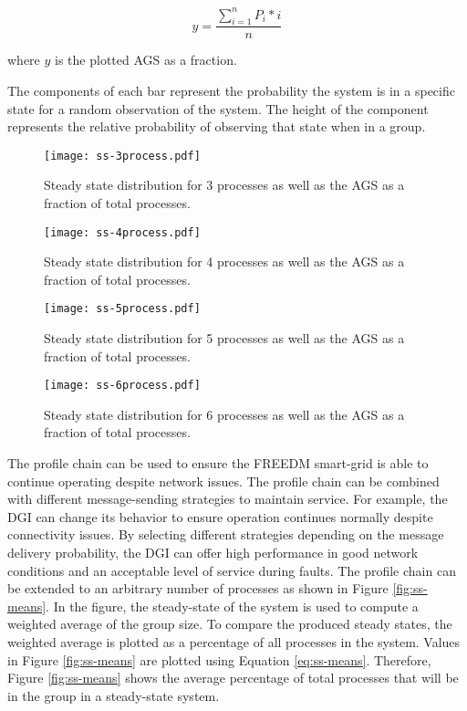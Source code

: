 \begin{equation} y = \frac{\sum_{i=1}^{n} P_{i}*i}{n} \label{eq:ss-means} \end{equation}

where $y$ is the plotted \ac{AGS} as a fraction.

The components of each bar represent the probability the system is in a specific state for a random observation of the system.
The height of the component represents the relative probability of observing that state when in a group.

\begin{figure}
    \centering
    \texttt{[image: ss-3process.pdf]}
    \caption{Steady state distribution for 3 processes as well as the \ac{AGS} as a fraction of total processes.}
    \label{fig:ss-3process}
\end{figure}

\begin{figure}
    \centering
    \texttt{[image: ss-4process.pdf]}
    \caption{Steady state distribution for 4 processes as well as the \ac{AGS} as a fraction of total processes.}
    \label{fig:ss-4process}
\end{figure}

\begin{figure}
    \centering
    \texttt{[image: ss-5process.pdf]}
    \caption{Steady state distribution for 5 processes as well as the \ac{AGS} as a fraction of total processes.}
    \label{fig:ss-5process}
\end{figure}

\begin{figure}
    \centering
    \texttt{[image: ss-6process.pdf]}
    \caption{Steady state distribution for 6 processes as well as the \ac{AGS} as a fraction of total processes.}
    \label{fig:ss-6process}
\end{figure}

The profile chain can be used to ensure the \ac{FREEDM} smart-grid is able to continue operating despite network issues.
The profile chain can be combined with different message-sending strategies to maintain service.
For example, the DGI can change its behavior to ensure operation continues normally despite connectivity issues.
By selecting different strategies depending on the message delivery probability, the DGI can offer high performance in good network conditions and an acceptable level of service during faults.
The profile chain can be extended to an arbitrary number of processes as shown in Figure \ref{fig:ss-means}.
In the figure, the steady-state of the system is used to compute a weighted average of the group size.
To compare the produced steady states, the weighted average is plotted as a percentage of all processes in the system.
Values in Figure \ref{fig:ss-means} are plotted using Equation \ref{eq:ss-means}.
Therefore, Figure \ref{fig:ss-means} shows the average percentage of total processes that will be in the group in a steady-state system.

